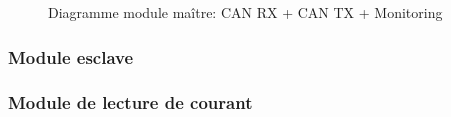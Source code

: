 		\begin{figure}[H]
			\centering
			\caption{Diagramme module maître: CAN RX + CAN TX + Monitoring }
			\label{fig:diagrammefonctionnelcanmonitoring}
		\end{figure}
		
		
	\subsubsection{Module esclave}
		\paragraph*{}
	\subsubsection{Module de lecture de courant}
		\paragraph*{}
		
		
		